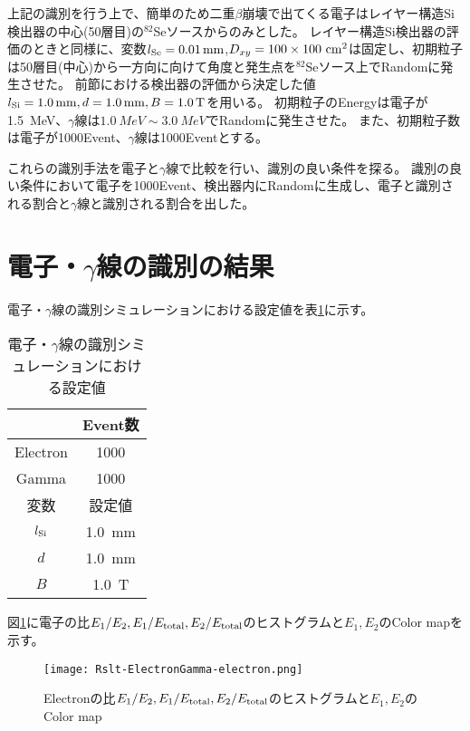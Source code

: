 \documentclass[a4paper,10pt]{jreport}
\begin{document}
上記の識別を行う上で、簡単のため二重$\beta$崩壊で出てくる電子はレイヤー構造Si検出器の中心(50層目)の$^{82}$Seソースからのみとした。
レイヤー構造Si検出器の評価のときと同様に、変数$l_{\rm{Se}} = \SI{0.01}{mm}$,$D_{xy} =100\times100\ \rm{cm}^2$は固定し、初期粒子は50層目(中心)から一方向に向けて角度と発生点を$^{82}$Seソース上でRandomに発生させた。
前節における検出器の評価から決定した値$l_{\rm{Si}}=\SI{1.0}{mm}, d=\SI{1.0}{mm}, B=\SI{1.0}{T}$を用いる。
初期粒子のEnergyは電子が\SI{1.5}{MeV}、$\gamma$線は$\SI{1.0}{MeV}\sim\SI{3.0}{MeV}$でRandomに発生させた。
また、初期粒子数は電子が1000Event、$\gamma$線は1000Eventとする。


これらの識別手法を電子と$\gamma$線で比較を行い、識別の良い条件を探る。
識別の良い条件において電子を1000Event、検出器内にRandomに生成し、電子と識別される割合と$\gamma$線と識別される割合を出した。





\section{電子・$\gamma$線の識別の結果}

電子・$\gamma$線の識別シミュレーションにおける設定値を表\ref{Tab-ElectronGamma-Settei}に示す。

\begin{table}[H] 
	\center
	\caption{電子・$\gamma$線の識別シミュレーションにおける設定値} \label{Tab-ElectronGamma-Settei}
	\begin{tabular}{cc}
	\hline
	 & Event数 \\
	 \hline
	Electron & 1000 \\
	Gamma & 1000 \\
	\hline
	変数 & 設定値 \\
	\hline
	$l_{\rm{Si}}$ & \SI{1.0}{mm} \\
	$d$ & \SI{1.0}{mm} \\
	$B$ & \SI{1.0}{T} \\
	\hline
	\end{tabular}
\end{table}

図\ref{Rslt-ElectronGamma-electron}に電子の比$E_1/E_2,E_1/E_{\rm{total}},E_2/E_{\rm{total}}$のヒストグラムと$E_1,E_2$のColor mapを示す。

\begin{figure}[H]
	\center
	\texttt{[image: Rslt-ElectronGamma-electron.png]}
	\caption{Electronの比$E_1/E_2,E_1/E_{\rm{total}},E_2/E_{\rm{total}}$のヒストグラムと$E_1,E_2$のColor map}
	\label{Rslt-ElectronGamma-electron}
\end{figure}
\end{document}
